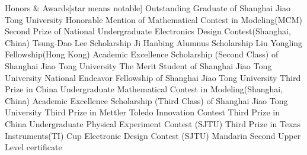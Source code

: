 
\begin{rubric}{Honors \& Awards}[star means notable]
		Outstanding Graduate of Shanghai Jiao Tong University
		Honorable Mention of Mathematical Contest in Modeling(MCM)
		Second Prize of National Undergraduate Electronics Design Contest(Shanghai, China)
		Tsung-Dao Lee Scholarship
		Ji Hanbing Alumnus Scholarship
		Liu Yongling Fellowship(Hong Kong)
        Academic Excellence Scholarship (Second Class) of Shanghai Jiao Tong University				
		The Merit Student of Shanghai Jiao Tong University
		National Endeavor Fellowship of Shanghai Jiao Tong University
		Third Prize in China Undergraduate Mathematical Contest in Modeling(Shanghai, China)
        Academic Excellence Scholarship (Third Class) of Shanghai Jiao Tong University
		Third Prize in Mettler Toledo Innovation Contest
		Third Prize in China Undergraduate Physical Experiment Contest (SJTU)
		Third Prize in Texas Instruments(TI) Cup Electronic Design Contest (SJTU)
        Mandarin Second Upper Level certificate
\end{rubric}

